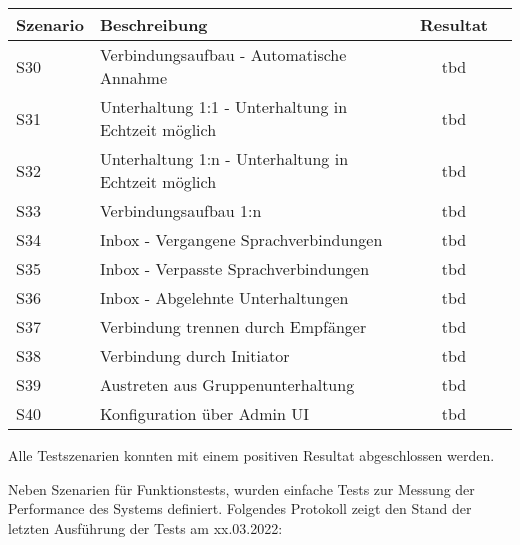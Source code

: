 \begin{table}[h]
    \centering
    \begin{tabular}{|l|p{11cm}|c|c|}
        \hline
        \textbf{Szenario} & \textbf{Beschreibung} & \textbf{Resultat} \\
        \hline
        S30         & Verbindungsaufbau - Automatische Annahme & tbd\\
        \hline
        S31         & Unterhaltung 1:1 - Unterhaltung in Echtzeit möglich & tbd\\
        \hline
        S32         & Unterhaltung 1:n - Unterhaltung in Echtzeit möglich & tbd\\
        \hline
        S33         & Verbindungsaufbau 1:n & tbd\\
        \hline
        S34         & Inbox - Vergangene Sprachverbindungen & tbd\\
        \hline
        S35         & Inbox - Verpasste Sprachverbindungen & tbd\\
        \hline
        S36         & Inbox - Abgelehnte Unterhaltungen & tbd\\
        \hline
        S37         & Verbindung trennen durch Empfänger & tbd\\
        \hline
        S38         & Verbindung durch Initiator & tbd\\
        \hline
        S39         & Austreten aus Gruppenunterhaltung & tbd\\
        \hline
        S40         & Konfiguration über Admin UI & tbd\\
        \hline
    \end{tabular}\label{tab:funktion_testplan_2}
\end{table}

Alle Testszenarien konnten mit einem positiven Resultat abgeschlossen werden.

Neben Szenarien für Funktionstests, wurden einfache Tests zur Messung der Performance des Systems definiert.
Folgendes Protokoll zeigt den Stand der letzten Ausführung der Tests am xx.03.2022:

